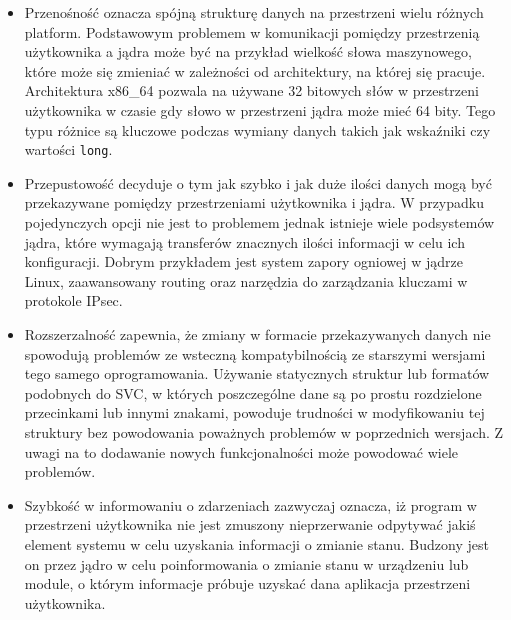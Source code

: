\documentclass[11pt]{scrartcl}
\begin{document}
\begin{itemize}
\item
  Przenośność oznacza spójną strukturę danych na przestrzeni wielu różnych platform. Podstawowym problemem w komunikacji pomiędzy przestrzenią użytkownika a jądra może być na przykład wielkość słowa maszynowego, które może się zmieniać w zależności od architektury, na której się pracuje. Architektura x86\_64 pozwala na używane 32 bitowych słów w przestrzeni użytkownika w czasie gdy słowo w przestrzeni jądra może mieć 64 bity. Tego typu różnice są kluczowe podczas wymiany danych takich jak wskaźniki czy wartości \texttt{long}.
\item
  Przepustowość decyduje o tym jak szybko i jak duże ilości danych mogą być przekazywane pomiędzy przestrzeniami użytkownika i jądra. W przypadku pojedynczych opcji nie jest to problemem jednak istnieje wiele podsystemów jądra, które wymagają transferów znacznych ilości informacji w celu ich konfiguracji. Dobrym przykładem jest system zapory ogniowej w jądrze Linux, zaawansowany routing oraz narzędzia do zarządzania kluczami w protokole IPsec.
\item
  Rozszerzalność zapewnia, że zmiany w formacie przekazywanych danych nie spowodują problemów ze wsteczną kompatybilnością ze starszymi wersjami tego samego oprogramowania. Używanie statycznych struktur lub formatów podobnych do SVC, w których poszczególne dane są po prostu rozdzielone przecinkami lub innymi znakami, powoduje trudności w modyfikowaniu tej struktury bez powodowania poważnych problemów w poprzednich wersjach. Z uwagi na to dodawanie nowych funkcjonalności może powodować wiele problemów.
\item
  Szybkość w informowaniu o zdarzeniach zazwyczaj oznacza, iż program w przestrzeni użytkownika nie jest zmuszony nieprzerwanie odpytywać jakiś element systemu w celu uzyskania informacji o zmianie stanu.  Budzony jest on przez jądro w celu poinformowania o zmianie stanu w urządzeniu lub module, o którym informacje próbuje uzyskać dana aplikacja przestrzeni użytkownika.
\end{itemize}
\end{document}

